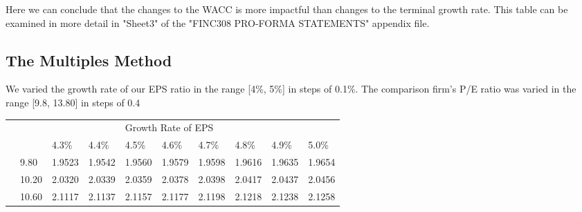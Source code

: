 \documentclass{article}
\begin{document}
Here we can conclude that the changes to the WACC is more impactful than changes to the terminal growth rate. This table can be examined in more detail in "Sheet3" of the "FINC308 PRO-FORMA STATEMENTS" appendix file.

\subsection{The Multiples Method}

We varied the growth rate of our EPS ratio in the range [4\%, 5\%] in steps of 0.1\%.
The comparison firm's P/E ratio was varied in the range [9.8, 13.80] in steps of 0.4

\begin{table}[h]
\begin{tabular}{llllllllll}
                          &                              &                             &                             & \multicolumn{3}{l}{Growth Rate of EPS}                                                                          &                             &                             &                             \\ \cline{2-10} 
\multicolumn{1}{l|}{}     & \multicolumn{1}{l|}{}        & \multicolumn{1}{l|}{4.3\%}  & \multicolumn{1}{l|}{4.4\%}  & \multicolumn{1}{l|}{4.5\%}  & \multicolumn{1}{l|}{4.6\%}  & \multicolumn{1}{l|}{4.7\%}                          & \multicolumn{1}{l|}{4.8\%}  & \multicolumn{1}{l|}{4.9\%}  & \multicolumn{1}{l|}{5.0\%}  \\ \cline{2-10} 
\multicolumn{1}{l|}{}     & \multicolumn{1}{l|}{9.80}    & \multicolumn{1}{l|}{1.9523} & \multicolumn{1}{l|}{1.9542} & \multicolumn{1}{l|}{1.9560} & \multicolumn{1}{l|}{1.9579} & \multicolumn{1}{l|}{1.9598}                         & \multicolumn{1}{l|}{1.9616} & \multicolumn{1}{l|}{1.9635} & \multicolumn{1}{l|}{1.9654} \\ \cline{2-10} 
\multicolumn{1}{l|}{}     & \multicolumn{1}{l|}{10.20}   & \multicolumn{1}{l|}{2.0320} & \multicolumn{1}{l|}{2.0339} & \multicolumn{1}{l|}{2.0359} & \multicolumn{1}{l|}{2.0378} & \multicolumn{1}{l|}{2.0398}                         & \multicolumn{1}{l|}{2.0417} & \multicolumn{1}{l|}{2.0437} & \multicolumn{1}{l|}{2.0456} \\ \cline{2-10} 
\multicolumn{1}{l|}{}     & \multicolumn{1}{l|}{10.60}   & \multicolumn{1}{l|}{2.1117} & \multicolumn{1}{l|}{2.1137} & \multicolumn{1}{l|}{2.1157} & \multicolumn{1}{l|}{2.1177} & \multicolumn{1}{l|}{2.1198}                         & \multicolumn{1}{l|}{2.1218} & \multicolumn{1}{l|}{2.1238} & \multicolumn{1}{l|}{2.1258} \\ \cline{2-10} 

\end{tabular}
\end{table}
\end{document}

